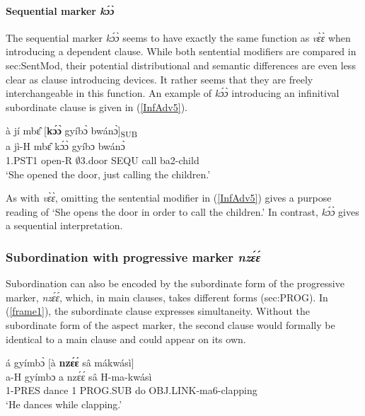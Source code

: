 \paragraph{Sequential marker {\itshape kɔ́ɔ̀}}

The sequential marker {\itshape kɔ́ɔ̀} seems to have exactly the same function as {\itshape vɛ̀ɛ̀} when introducing a dependent clause. While both sentential modifiers are compared in {sec:SentMod}, their potential distributional and semantic differences are even less clear as clause introducing devices. It rather seems that they are freely interchangeable in this function. An example of {\itshape kɔ́ɔ̀} introducing an  infinitival subordinate clause is given in (\ref{InfAdv5}). 


\begin{exe} 
\ex\label{InfAdv5} 
  \glll  à jí mbɛ̂ [{\bfseries kɔ́ɔ̀} gyíbɔ̀ bwánɔ̀]\textsubscript{SUB} \\
         a jì-H mbɛ̂ kɔ́ɔ̀ gyíbɔ bwánɔ̀ \\
           1.PST1 open-R $\emptyset$3.door SEQU call ba2-child \\
    \trans `She opened the door, just calling the children.'
\end{exe}

As with {\itshape vɛ̀ɛ̀}, omitting the sentential modifier in (\ref{InfAdv5}) gives a purpose reading of `She opens the door in order to call the children.' In contrast, {\itshape kɔ́ɔ̀} gives a sequential interpretation.


\subsubsection{Subordination with progressive marker {\itshape nzɛ́ɛ́}}
\label{sec:SUBnzee}

Subordination can also be encoded by the subordinate form of the progressive marker, {\itshape nzɛ́ɛ́}, which, in main clauses, takes different forms ({sec:PROG}). In (\ref{frame1}), the subordinate clause expresses simultaneity. Without the subordinate form of the aspect marker, the second clause would formally be identical to a main clause and could appear on its own.

\begin{exe} 
\ex\label{frame1}
  \glll  á gyímbɔ̀ [à {\bfseries nzɛ́ɛ́} sâ mákwásì] \\
        a-H gyímbɔ a nzɛ́ɛ́ sâ H-ma-kwásì \\
            1-PRES dance 1 PROG.SUB do OBJ.LINK-ma6-clapping \\
    \trans `He dances while clapping.'
\end{exe}
















